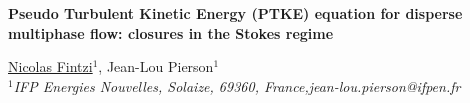 \documentclass[12pt,a4paper]{article}
\begin{document}
\pagestyle{fancy}
\fancyhf{}

\lhead{\textcolor{mygray}{12th International Conference on Multiphase flow}}
\rhead{\textcolor{mygray}{ICMF 2025, Toulouse, France, May 12-16, 2025}}
\lfoot{}
\cfoot{}
\rfoot{}

\begin{center}
{\large {\bf Pseudo Turbulent Kinetic Energy (PTKE) equation for disperse multiphase flow: closures in the Stokes regime}}

\vspace{10pt}


\underline{Nicolas Fintzi}$^1$, Jean-Lou Pierson$^1$\\
{\it
$^1$IFP Energies Nouvelles, Solaize, 69360, France,jean-lou.pierson@ifpen.fr\\
}
\end{center}
\end{document}
